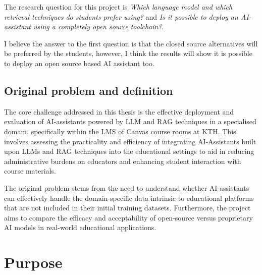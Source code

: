 The research question for this project is \textit{Which language model and which retrieval techniques do students prefer using?} and \textit{Is it possible to deploy an AI-assistant using a completely open source toolchain?}.


I believe the answer to the first question is that the closed source alternatives will be preferred by the students, however, I think the results will show it is possible to deploy an open source based AI assistant too.


\subsection{Original problem and definition}
\label{sec:researchQuestion}






The core challenge addressed in this thesis is the effective deployment and evaluation of AI-assistants powered by \gls{LLM} and \gls{RAG} techniques in a specialised domain, specifically within the \gls{LMS} of Canvas course rooms at KTH. This involves assessing the practicality and efficiency of integrating AI-Assistants built upon LLMs and RAG techniques into the educational settings to aid in reducing administrative burdens on educators and enhancing student interaction with course materials.


The original problem stems from the need to understand whether AI-assistants can effectively handle the domain-specific data intrinsic to educational platforms that are not included in their initial training datasets. Furthermore, the project aims to compare the efficacy and acceptability of open-source versus proprietary AI models in real-world educational applications.


\section{Purpose}


